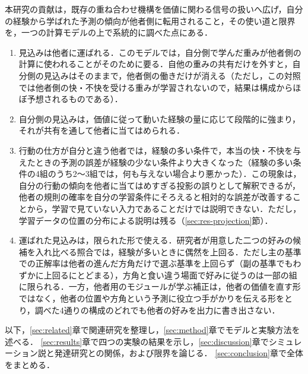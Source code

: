 本研究の貢献は，既存の重ね合わせ機構を価値に関わる信号の扱いへ広げ，自分の経験から学ばれた予測の傾向が他者側に転用されること，その使い道と限界を，一つの計算モデルの上で系統的に調べた点にある．
\begin{enumerate}
  \item 見込みは他者に運ばれる．このモデルでは，自分側で学んだ重みが他者側の計算に使われることがそのために要る．自他の重みの共有だけを外すと，自分側の見込みはそのままで，他者側の働きだけが消える（ただし，この対照では他者側の快・不快を受ける重みが学習されないので，結果は構成からほぼ予想されるものである）．
  \item 自分側の見込みは，価値に従って動いた経験の量に応じて段階的に強まり，それが共有を通して他者に当てはめられる．
  \item 行動の仕方が自分と違う他者では，経験の多い条件で，本当の快・不快を与えたときの予測の誤差が経験の少ない条件より大きくなった（経験の多い条件の4組のうち2〜3組では，何も与えない場合より悪かった）．この現象は，自分の行動の傾向を他者に当てはめすぎる投影の誤りとして解釈できるが，他者の規則の確率を自分の学習条件にそろえると相対的な誤差が改善することから，学習で見ていない入力であることだけでは説明できない．ただし，学習データの位置の分布による説明は残る（\ref{sec:res-projection}節）．
  \item 運ばれた見込みは，限られた形で使える．研究者が用意した二つの好みの候補を入れ比べる照合では，経験が多いときに偶然を上回る．ただし主の基準での正解率は他者の進んだ方角だけで選ぶ基準を上回らず（副の基準でもわずかに上回るにとどまる），方角と食い違う場面で好みに従うのは一部の組に限られる．一方，他者用のモジュールが学ぶ補正は，他者の価値を直す形ではなく，他者の位置や方角という予測に役立つ手がかりを伝える形をとり，調べた4通りの構成のどれでも他者の好みを出力に書き出さない．
\end{enumerate}

以下，\ref{sec:related}章で関連研究を整理し，\ref{sec:method}章でモデルと実験方法を述べる．
\ref{sec:results}章で四つの実験の結果を示し，\ref{sec:discussion}章でシミュレーション説と発達研究との関係，および限界を論じる．
\ref{sec:conclusion}章で全体をまとめる．